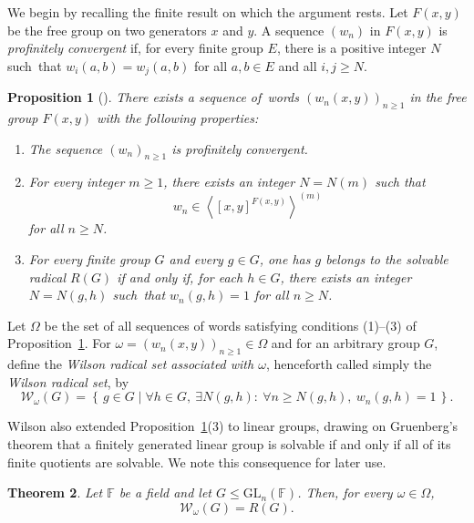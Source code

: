 \documentclass[10pt,a4paper]{amsart}
\numberwithin{equation}{section}
\newtheorem{theorem}{Theorem}[section]
\newtheorem{proposition}[theorem]{Proposition}
\numberwithin{equation}{section}
\begin{document}
\medskip
We begin by recalling the finite result on which the argument rests. 
Let $F(x,y)$ be the free group on two generators $x$ and $y$. 
A sequence $(w_n)$ in $F(x,y)$ is \emph{profinitely convergent} if, for every finite group $E$, there is a positive integer $N$ such~that $w_i(a,b)=w_j(a,b)$ for all $a,b\in E$ and all $i,j\geq N$. 

\begin{proposition}[{\cite[Eq.~(2) and Theorem]{Wilson2011}}]
\label{prop:Wilson-sequence}
There exists a sequence of~words $(w_n(x,y))_{n\geq 1}$ in the free group $F(x,y)$ with the following properties:
\begin{enumerate}[label=\textup{(\arabic*)}]
    \item The sequence $(w_n)_{n\geq 1}$ is profinitely convergent.
    \item For every integer $m\geq 1$, there exists an integer $N=N(m)$ such that
          $$w_n\in \left\langle [x,y]^{F(x,y)}\right\rangle^{(m)}$$ 
          for all $n\geq N$.
    \item For every finite group $G$ and every $g\in G$, one has $g$ belongs to the solvable radical $R(G)$ if and only if, for each $h\in G$, there exists an integer
          $N=N(g,h)$ such~that $w_n(g,h)=1$ for all $n\geq N$.
\end{enumerate}
\end{proposition}
  
Let $\Omega$ be the set of all sequences of words satisfying conditions \textup{(1)}--\textup{(3)} of Proposition~\ref{prop:Wilson-sequence}.  
For $\omega=(w_n(x,y))_{n\geq 1}\in\Omega$ and for an arbitrary group $G$, define the \emph{Wilson radical set associated with $\omega$}, henceforth
called simply the \emph{Wilson radical set}, by 
$$\mathcal W_\omega(G)=\left\{\,g\in G \mid \forall h\in G,\ \exists N(g,h):\ \forall n\geq N(g,h),\ w_n(g,h)=1 \,\right\}.$$

Wilson also extended Proposition~\ref{prop:Wilson-sequence}(3) to linear groups, drawing on Gruenberg's theorem \cite[Theorem~2]{Gruenberg66} that a finitely generated linear group is solvable if and only if all of its finite quotients are solvable.  We note this consequence for later use.

\begin{theorem}
\label{theo:Wilsonradsetlineargroup}
Let $\mathbb F$ be a field and let $G\leq \mathrm{GL}_n(\mathbb F)$.  Then, for every $\omega\in\Omega$,
$$\mathcal W_\omega(G)=R(G).$$
\end{theorem}
\end{document}

